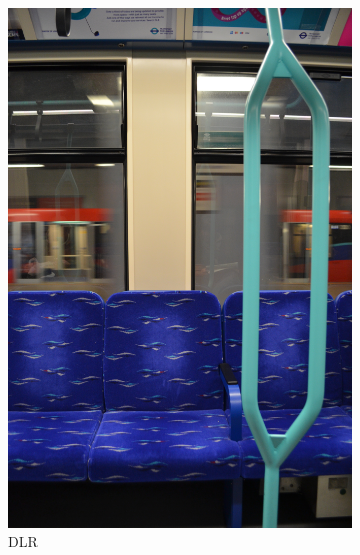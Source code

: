 \begin{figure}[H]
\begin{subfigure}[b]{0.22\textwidth}
        \includegraphics[width=\textwidth]{guidance/images/rathbone2017dlr.jpg}
        \caption{DLR \parencite{rathbone2017dlr}}
        \label{fig:rathbone2017dlr}
    \end{subfigure}
    \hfill
    \begin{subfigure}[b]{0.22\textwidth}
        \centering

\end{subfigure}
\end{figure}
